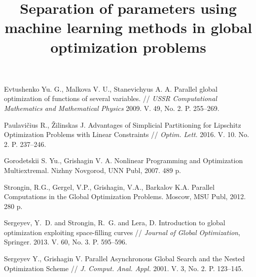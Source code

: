 \documentclass[11pt, oneside, a4paper]{article}
\begin{document}
\title{Separation of parameters using machine learning methods in global optimization problems}




\begin{biblioen}

 Evtushenko Yu. G., Malkova V. U., Stanevichyus A. A. Parallel global optimization of functions of several variables. // {\it USSR Computational Mathematics and Mathematical Physics} 2009. V. 49, No. 2. P. 255--269.

 Paulavi{\v c}ius R., {\v Z}ilinskas J. Advantages of Simplicial Partitioning for Lipschitz Optimization Problems with Linear Constraints // {\it Optim. Lett.} 2016. V. 10. No. 2. P. 237--246.

 Gorodetskii S. Yu., Grishagin V. A. Nonlinear Programming and Optimization Multiextremal. Nizhny Novgorod, UNN Publ, 2007. 489 p.

 Strongin, R.G., Gergel, V.P., Grishagin, V.A., Barkalov K.A. Parallel Computations in the Global Optimization Problems. Moscow, MSU Publ, 2012. 280 p.

 Sergeyev, Y.~D. and Strongin, R.~G. and Lera, D. Introduction to global optimization exploiting space-filling curves // {\it Journal of Global Optimization}, Springer. 2013. V. 60, No. 3. P. 595--596.

 Sergeyev Y., Grishagin V. Parallel Asynchronous Global Search and the Nested Optimization Scheme // {\it J. Comput. Anal. Appl.} 2001. V. 3, No. 2. P. 123--145.

\end{biblioen}
\end{document}
